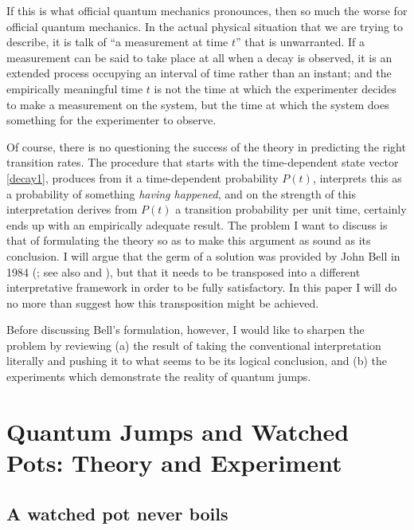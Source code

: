 \documentclass[12pt,a4paper,reqno]{article}
\renewcommand{\(}{\left(}
\renewcommand{\)}{\right)}
\newcommand{\<}{\langle}
\renewcommand{\>}{\rangle}
\theoremstyle{plain} %
\theoremstyle{definition}
\theoremstyle{remark}
\begin{document}
If this is what official quantum mechanics pronounces, then so much the 
worse for official quantum mechanics. In the actual physical situation that 
we are trying to describe, it is talk of ``a measurement at time $t$'' 
that is unwarranted. If a measurement can be said to take place at all 
when a decay is observed, it is an extended process occupying an interval 
of time rather than an instant; and the empirically meaningful time $t$ 
is not the time at which the experimenter decides to make a measurement 
on the system, but the time at which the system does something for the 
experimenter to observe.

Of course, there is no questioning the success of the theory in predicting 
the right transition rates. The procedure that starts with the time-dependent 
state vector \eqref{decay1}, produces from it a time-dependent probability 
$P(t)$, interprets this as a probability of something {\em having happened}, 
and on the strength of this interpretation derives from $P(t)$ a transition 
probability per unit time, certainly ends up with an empirically adequate 
result. The problem I want to discuss is that of formulating the theory 
so as to make this argument as sound as its conclusion. I will argue that
the germ of a solution was provided by John Bell in 1984
(\cite{Bell:beables}; see also \cite{QMPN} and \cite{Bub:book}), but
that it needs to be transposed into a different interpretative framework
in order to be fully satisfactory. In this paper I will do no more than suggest
how this transposition might be achieved.

Before discussing Bell's formulation, however, I would like to sharpen 
the problem by reviewing (a) the result of taking the conventional interpretation 
literally and pushing it to what seems to be its logical conclusion, and 
(b) the experiments which demonstrate the reality of quantum jumps.


\section{Quantum Jumps and Watched Pots: Theory and Experiment}

\subsection{A watched pot never boils}
\end{document}
